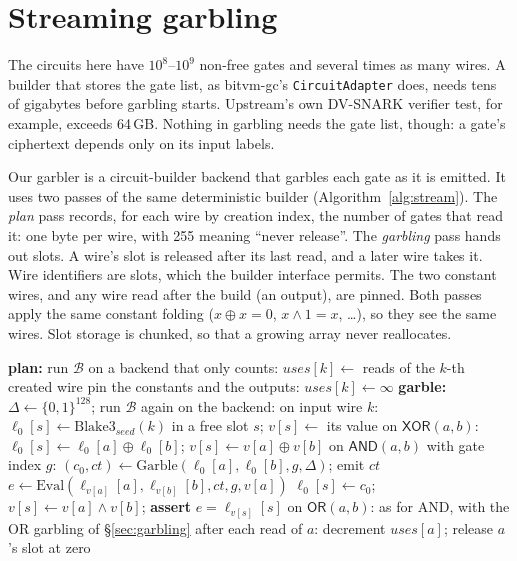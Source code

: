 \documentclass[11pt]{article}
\newcommand{\AND}{\textsf{AND}}
\newcommand{\XOR}{\textsf{XOR}}
\newcommand{\blake}{\mathrm{Blake3}}
\begin{document}
\section{Streaming garbling}\label{sec:streaming}

The circuits here have $10^8$--$10^9$ non-free gates and several times as many
wires. A builder that stores the gate list, as bitvm-gc's \texttt{CircuitAdapter}
does, needs tens of gigabytes before garbling starts. Upstream's own DV-SNARK
verifier test, for example, exceeds 64\,GB. Nothing in garbling needs the gate
list, though: a gate's ciphertext depends only on its input labels.

Our garbler is a circuit-builder backend that garbles each gate as it is
emitted. It uses two passes of the same deterministic builder
(Algorithm~\ref{alg:stream}). The \emph{plan} pass records, for each wire by
creation index, the number of gates that read it: one byte per wire, with 255
meaning ``never release''. The \emph{garbling} pass hands out slots. A wire's
slot is released after its last read, and a later wire takes it. Wire
identifiers are slots, which the builder interface permits. The two constant
wires, and any wire read after the build (an output), are pinned. Both passes
apply the same constant folding ($x\oplus x=0$, $x\wedge 1=x$, \ldots), so they
see the same wires. Slot storage is chunked, so that a growing array never
reallocates.

\begin{algorithm}[t]
\caption{Streaming garbling of a deterministic builder $\mathcal{B}$}
\label{alg:stream}
\begin{algorithmic}[1]
\State \textbf{plan:} run $\mathcal{B}$ on a backend that only counts: $\mathit{uses}[k]\gets$ reads of the $k$-th created wire
\State pin the constants and the outputs: $\mathit{uses}[k]\gets\infty$
\State \textbf{garble:} $\Delta\gets\{0,1\}^{128}$; run $\mathcal{B}$ again on the backend:
\State \quad on input wire $k$: $\ell_0[s]\gets\blake_{\mathit{seed}}(k)$ in a free slot $s$; $v[s]\gets$ its value
\State \quad on $\XOR(a,b)$: $\ell_0[s]\gets\ell_0[a]\oplus\ell_0[b]$; $v[s]\gets v[a]\oplus v[b]$
\State \quad on $\AND(a,b)$ with gate index $g$:
\State \qquad $(c_0,\mathit{ct})\gets\mathrm{Garble}(\ell_0[a],\ell_0[b],g,\Delta)$; emit $\mathit{ct}$
\State \qquad $e\gets\mathrm{Eval}(\ell_{v[a]}[a],\ell_{v[b]}[b],\mathit{ct},g,v[a])$
\State \qquad $\ell_0[s]\gets c_0$; $v[s]\gets v[a]\wedge v[b]$; \textbf{assert} $e=\ell_{v[s]}[s]$
\State \quad on $\textsf{OR}(a,b)$: as for \AND{}, with the \textsf{OR} garbling of \S\ref{sec:garbling}
\State \quad after each read of $a$: decrement $\mathit{uses}[a]$; release $a$'s slot at zero
\end{algorithmic}
\end{algorithm}
\end{document}
